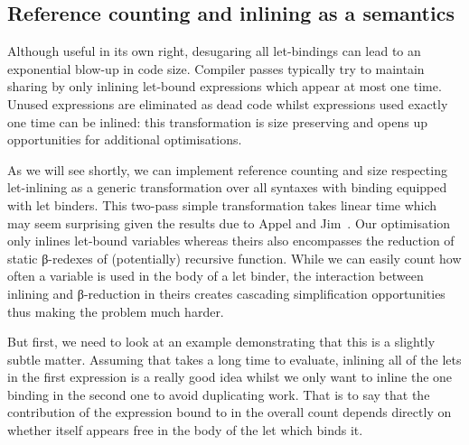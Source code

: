 \subsection{Reference counting and inlining as a semantics}\label{section:inlining}

Although useful in its own right, desugaring all let-bindings can lead
to an exponential blow-up in code size. Compiler passes typically try
to maintain sharing by only inlining let-bound expressions which appear
at most one time. Unused expressions are eliminated as dead code whilst
expressions used exactly one time can be inlined: this transformation is
size preserving and opens up opportunities for additional optimisations.

As we will see shortly, we can implement reference counting and size
respecting let-inlining as a generic transformation over all syntaxes
with binding equipped with let binders. This two-pass simple transformation
takes linear time which may seem surprising given the results due to Appel and
Jim~\citeyear{DBLP:journals/jfp/AppelJ97}. Our optimisation only inlines
let-bound variables whereas theirs also encompasses the reduction of static
β-redexes of (potentially) recursive function. While we can easily count how
often a variable is used in the body of a let binder, the interaction between
inlining and β-reduction in theirs creates cascading simplification opportunities
thus making the problem much harder.

But first, we need to look at an example demonstrating that this is a
slightly subtle matter. Assuming that  takes a long time
to evaluate, inlining all of the lets in the first expression is a really
good idea whilst we only want to inline the one binding  in the
second one to avoid duplicating work. That is to say that the contribution
of the expression bound to  in the overall count depends directly
on whether  itself appears free in the body of the let which binds it.

\noindent
\begin{minipage}{\textwidth}
  \begin{minipage}{0.45\textwidth}
    \centering
  \end{minipage}
  \begin{minipage}{0.45\textwidth}
    \centering
  \end{minipage}
\end{minipage}

